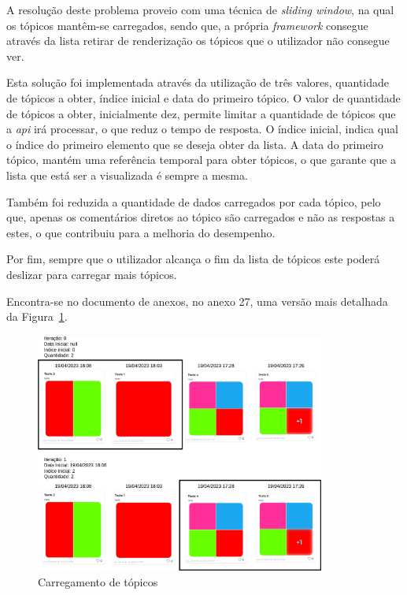 A resolução deste problema proveio com uma técnica de \textit{sliding window}, na qual os tópicos mantêm-se carregados, sendo que, a própria \textit{framework} consegue através da lista retirar de renderização os tópicos que o utilizador não consegue ver. 

Esta solução foi implementada através da utilização de três valores, quantidade de tópicos a obter, índice inicial e data do primeiro tópico. O valor de quantidade de tópicos a obter, inicialmente dez, permite limitar a quantidade de tópicos que a \textit{\acrshort{api}} irá processar, o que reduz o tempo de resposta. O índice inicial, indica qual o índice do primeiro elemento que se deseja obter da lista. A data do primeiro tópico, mantém uma referência temporal para obter tópicos, o que garante que a lista que está ser a visualizada é sempre a mesma.

Também foi reduzida a quantidade de dados carregados por cada tópico, pelo que, apenas os comentários diretos ao tópico são carregados e não as respostas a estes, o que contribuiu para a melhoria do desempenho.

\newpage

Por fim, sempre que o utilizador alcança o fim da lista de tópicos este poderá deslizar para carregar mais tópicos.

Encontra-se no documento de anexos, no anexo 27, uma versão mais detalhada da Figura~\ref*{fig:74}.

\begin{figure}[htb]
 \centering
 \includegraphics[width=0.85\textwidth]{images/implementacao/frontend/forum/loading_topics/topics_loading.png}
 \caption{Carregamento de tópicos}
 \label{fig:74}
\end{figure}

